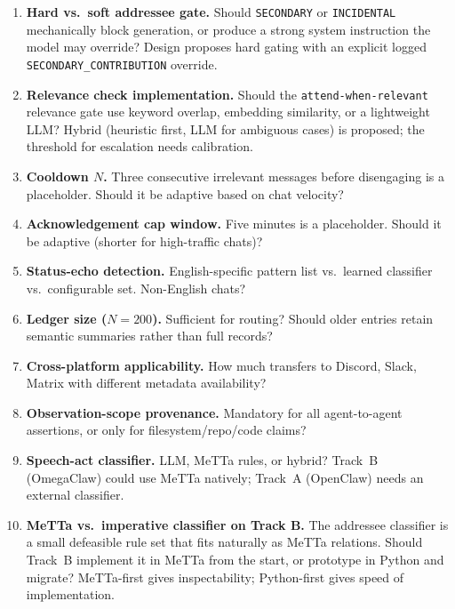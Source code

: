 \documentclass[11pt]{article}
\begin{document}
\begin{enumerate}
\item \textbf{Hard vs.\ soft addressee gate.}  Should \texttt{SECONDARY} or
\texttt{INCIDENTAL} mechanically block generation, or produce a strong system
instruction the model may override?  Design proposes hard gating with an
explicit logged \texttt{SECONDARY\_CONTRIBUTION} override.

\item \textbf{Relevance check implementation.}  Should the
\texttt{attend-when-relevant} relevance gate use keyword overlap, embedding
similarity, or a lightweight LLM?  Hybrid (heuristic first, LLM for ambiguous
cases) is proposed; the threshold for escalation needs calibration.

\item \textbf{Cooldown $N$.}  Three consecutive irrelevant messages before
disengaging is a placeholder.  Should it be adaptive based on chat velocity?

\item \textbf{Acknowledgement cap window.}  Five minutes is a placeholder.
Should it be adaptive (shorter for high-traffic chats)?

\item \textbf{Status-echo detection.}  English-specific pattern list vs.\
learned classifier vs.\ configurable set.  Non-English chats?

\item \textbf{Ledger size ($N=200$).}  Sufficient for routing?  Should older
entries retain semantic summaries rather than full records?

\item \textbf{Cross-platform applicability.}  How much transfers to Discord,
Slack, Matrix with different metadata availability?

\item \textbf{Observation-scope provenance.}  Mandatory for all
agent-to-agent assertions, or only for filesystem/repo/code claims?

\item \textbf{Speech-act classifier.}  LLM, MeTTa rules, or hybrid?
Track~B (OmegaClaw) could use MeTTa natively; Track~A (OpenClaw) needs an
external classifier.

\item \textbf{MeTTa vs.\ imperative classifier on Track B.}  The addressee
classifier is a small defeasible rule set that fits naturally as MeTTa
relations.  Should Track~B implement it in MeTTa from the start, or prototype
in Python and migrate?  MeTTa-first gives inspectability; Python-first gives
speed of implementation.
\end{enumerate}
\end{document}
